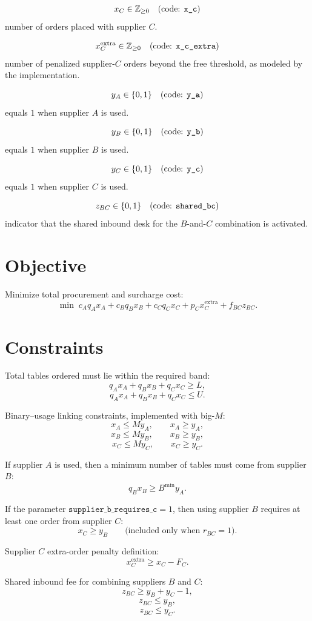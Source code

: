 \[
x_C \in \mathbb{Z}_{\ge 0}\quad \text{(code: \texttt{x\_c})}
\]
number of orders placed with supplier \(C\).

\[
x_C^{\text{extra}} \in \mathbb{Z}_{\ge 0}\quad \text{(code: \texttt{x\_c\_extra})}
\]
number of penalized supplier-\(C\) orders beyond the free threshold, as modeled by the implementation.

\[
y_A \in \{0,1\}\quad \text{(code: \texttt{y\_a})}
\]
equals \(1\) when supplier \(A\) is used.

\[
y_B \in \{0,1\}\quad \text{(code: \texttt{y\_b})}
\]
equals \(1\) when supplier \(B\) is used.

\[
y_C \in \{0,1\}\quad \text{(code: \texttt{y\_c})}
\]
equals \(1\) when supplier \(C\) is used.

\[
z_{BC} \in \{0,1\}\quad \text{(code: \texttt{shared\_bc})}
\]
indicator that the shared inbound desk for the \(B\)-and-\(C\) combination is activated.

\section*{Objective}

Minimize total procurement and surcharge cost:
\[
\min\;
c_A q_A x_A + c_B q_B x_B + c_C q_C x_C
+ p_C x_C^{\text{extra}} + f_{BC} z_{BC}.
\]

\section*{Constraints}

Total tables ordered must lie within the required band:
\[
q_A x_A + q_B x_B + q_C x_C \ge L,
\]
\[
q_A x_A + q_B x_B + q_C x_C \le U.
\]

Binary--usage linking constraints, implemented with big-\(M\):
\[
x_A \le M y_A,\qquad x_A \ge y_A,
\]
\[
x_B \le M y_B,\qquad x_B \ge y_B,
\]
\[
x_C \le M y_C,\qquad x_C \ge y_C.
\]

If supplier \(A\) is used, then a minimum number of tables must come from supplier \(B\):
\[
q_B x_B \ge B^{\min} y_A.
\]

If the parameter \(\texttt{supplier\_b\_requires\_c}=1\), then using supplier \(B\) requires at least one order from supplier \(C\):
\[
x_C \ge y_B
\qquad \text{(included only when } r_{BC}=1\text{)}.
\]

Supplier \(C\) extra-order penalty definition:
\[
x_C^{\text{extra}} \ge x_C - F_C.
\]

Shared inbound fee for combining suppliers \(B\) and \(C\):
\[
z_{BC} \ge y_B + y_C - 1,
\]
\[
z_{BC} \le y_B,
\]
\[
z_{BC} \le y_C.
\]

